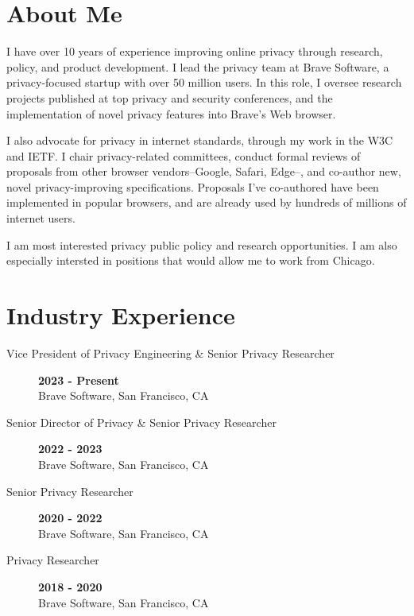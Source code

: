 \documentclass[wideaddress]{vitae}
\author{Peter E. Snyder}
\begin{document}
  \maketitle

  \section{About Me}
  \begin{description}
    \item{\noindent I have over 10 years of experience improving online privacy through research,
    policy, and product development. I lead the privacy team at Brave Software,
    a privacy-focused startup with over 50 million users.
    In this role, I oversee research projects published at top privacy and security
    conferences, and the implementation of novel privacy features into Brave's Web browser.}

    \item{\noindent I also advocate for privacy in internet standards, through
    my work in the W3C and IETF. I chair privacy-related committees, conduct formal
    reviews of proposals from other browser vendors--Google, Safari, Edge--,
    and co-author new, novel privacy-improving specifications. Proposals
    I've co-authored have been implemented in popular browsers, and are already
    used by hundreds of millions of internet users.}

    \item{\noindent I am most interested privacy public policy and research
    opportunities. I am also especially intersted in positions that would allow me to
    work from Chicago.}
  \end{description}

  \section{Industry Experience}
  \begin{description}
    \item[Vice President of Privacy Engineering \& Senior Privacy Researcher] \hfill \textbf{2023 - Present}\\
    Brave Software, San Francisco, CA

    \item[Senior Director of Privacy \& Senior Privacy Researcher] \hfill \textbf{2022 - 2023}\\
    Brave Software, San Francisco, CA

    \item[Senior Privacy Researcher] \hfill \textbf{2020 - 2022}\\
    Brave Software, San Francisco, CA

    \item[Privacy Researcher] \hfill \textbf{2018 - 2020}\\
    Brave Software, San Francisco, CA
  \end{description}
\end{document}
